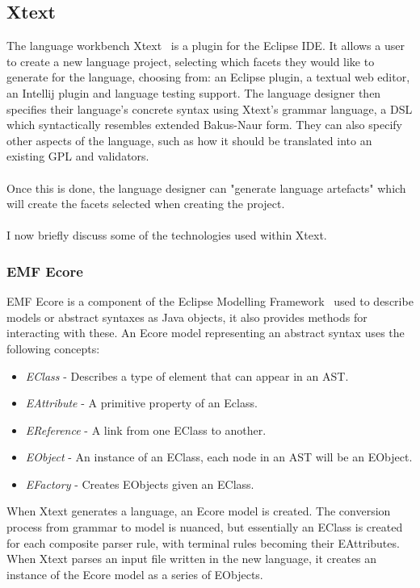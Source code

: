 \documentclass{article}
\begin{document}
\subsection{Xtext}\label{xtext}
The language workbench Xtext~\cite{xtext} is a plugin for the Eclipse IDE. It allows a user to create a new language project, selecting which facets they would like to generate for the language, choosing from: an Eclipse plugin, a textual web editor, an Intellij plugin and language testing support. The language designer then specifies their language's concrete syntax using Xtext's grammar language, a DSL which syntactically resembles extended Bakus-Naur form. They can also specify other aspects of the language, such as how it should be translated into an existing GPL and validators.
\\
\\
Once this is done, the language designer can "generate language artefacts" which will create the facets selected when creating the project. 
\\
\\
I now briefly discuss some of the technologies used within Xtext.
\subsubsection{EMF Ecore}\label{emf}
EMF Ecore is a component of the Eclipse Modelling Framework~\cite{emf} used to describe models or abstract syntaxes as Java objects, it also provides methods for interacting with these. An Ecore model representing an abstract syntax uses the following concepts:
\begin{itemize}
\item \emph{EClass} - Describes a type of element that can appear in an AST.
\item \emph{EAttribute} - A primitive property of an Eclass.
\item \emph{EReference} - A link from one EClass to another.
\item \emph{EObject} - An instance of an EClass, each node in an AST will be an EObject.
\item \emph{EFactory} - Creates EObjects given an EClass.
\end{itemize}
When Xtext generates a language, an Ecore model is created. The conversion process from grammar to model is nuanced, but essentially an EClass is created for each composite parser rule, with terminal rules becoming their EAttributes. When Xtext parses an input file written in the new language, it creates an instance of the Ecore model as a series of EObjects.
\end{document}
